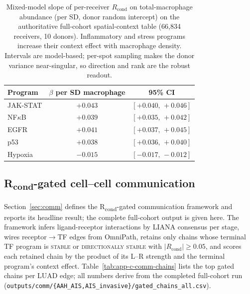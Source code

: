 \begin{table}[htbp]
  \centering
  \caption[Macrophage niche vs context residual, AAH$\rightarrow$AIS]{Mixed-model slope of
  per-receiver $R_{\mathrm{cond}}$ on total-macrophage abundance (per SD, donor random intercept) on
  the authoritative full-cohort spatial-context table (66{,}834 receivers, 10 donors). Inflammatory and
  stress programs increase their context effect with macrophage density. Intervals are model-based;
  per-spot sampling makes the donor variance near-singular, so direction and rank are the robust
  readout.}
  \label{tab:app-c-il1b}
  \footnotesize
  \begin{tabular}{lcc}
    \toprule
    Program & $\beta$ per SD macrophage & 95\% CI \\
    \midrule
    JAK-STAT & $+0.043$ & $[+0.040,\,+0.046]$ \\
    NF$\kappa$B  & $+0.039$ & $[+0.035,\,+0.042]$ \\
    EGFR     & $+0.041$ & $[+0.037,\,+0.045]$ \\
    p53      & $+0.038$ & $[+0.036,\,+0.040]$ \\
    Hypoxia  & $-0.015$ & $[-0.017,\,-0.012]$ \\
    \bottomrule
  \end{tabular}
\end{table}

\subsection{R\textsubscript{cond}-gated cell--cell communication}
\label{sec:app-c-comm}

Section~\ref{sec:comm} defines the R\textsubscript{cond}-gated communication framework
and reports its headline result; the complete full-cohort output is given here. The framework infers
ligand-receptor interactions by LIANA consensus per stage, wires receptor$\rightarrow$TF edges from
OmniPath, retains only chains whose terminal TF program is \textsc{stable} or
\textsc{directionally stable}
with $|R_{\mathrm{cond}}|\geq0.05$, and scores each retained chain by the product of its L--R strength
and the terminal program's context effect. Table~\ref{tab:app-c-comm-chains} lists the top gated chains
per LUAD edge; all numbers derive from the completed full-cohort run
(\texttt{outputs/comm/\{AAH\_AIS,AIS\_invasive\}/gated\_chains\_all.csv}).

